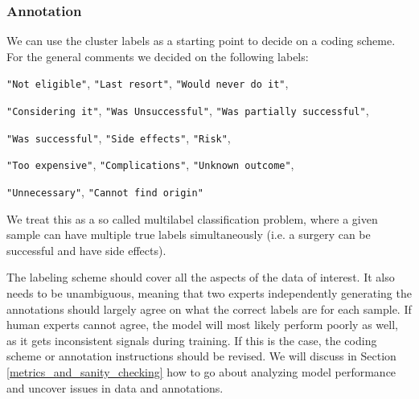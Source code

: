 \subsubsection{Annotation}
We can use the cluster labels as a starting point to decide on a coding scheme. For the general comments we decided on the following labels:
\begin{displayquote}
    \texttt{"Not eligible"},
    \texttt{"Last resort"},
    \texttt{"Would never do it"},

    \texttt{"Considering it"},
    \texttt{"Was Unsuccessful"},
    \texttt{"Was partially successful"},

    \texttt{"Was successful"},
    \texttt{"Side effects"},
    \texttt{"Risk"},

    \texttt{"Too expensive"},
    \texttt{"Complications"},
    \texttt{"Unknown outcome"},

    \texttt{"Unnecessary"},
    \texttt{"Cannot find origin"}
\end{displayquote}
We treat this as a so called multilabel classification problem, where a given sample can have multiple true labels simultaneously (i.e. a surgery can be successful and have side effects).

The labeling scheme should cover all the aspects of the data of interest.
It also needs to be unambiguous, meaning that two experts independently generating the annotations should largely agree on what the correct labels are for each sample.
If human experts cannot agree, the model will most likely perform poorly as well, as it gets inconsistent signals during training.
If this is the case, the coding scheme or annotation instructions should be revised.
We will discuss in Section \ref{metrics_and_sanity_checking} how to go about analyzing model performance and uncover issues in data and annotations.



